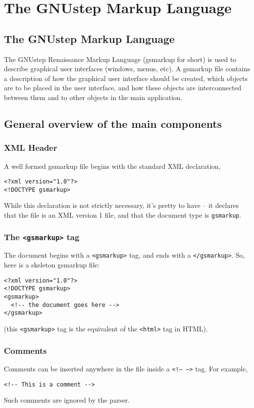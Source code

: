 \chapter{The GNUstep Markup Language}
\section{The GNUstep Markup Language}

The GNUstep Renaissance Markup Language (gsmarkup for short) is used to
describe graphical user interfaces (windows, menus, etc).  A gsmarkup
file contains a description of how the graphical user interface should
be created, which objects are to be placed in the user interface, and
how these objects are interconnected between them and to other objects
in the main application.

\section{General overview of the main components}

\subsection{XML Header}
A well formed gsmarkup file begins with the standard XML declaration,
\begin{verbatim}
<?xml version="1.0"?>
<!DOCTYPE gsmarkup>
\end{verbatim}
While this declaration is not strictly necessary, it's pretty to have
-- it declares that the file is an XML version 1 file, and that the
document type is \texttt{gsmarkup}.

\subsection{The \texttt{<gsmarkup>} tag}
The document begins with a \texttt{<gsmarkup>} tag, and ends with a 
\texttt{</gsmarkup>}.  So, here is a skeleton gsmarkup file:
\begin{verbatim}
<?xml version="1.0"?>
<!DOCTYPE gsmarkup>
<gsmarkup>
  <!-- the document goes here -->
</gsmarkup>
\end{verbatim}
(this \texttt{<gsmarkup>} tag is the equivalent of the \texttt{<html>}
tag in HTML).

\subsection{Comments}
Comments can be inserted anywhere in the file inside a \texttt{<!--
-->} tag.  For example,
\begin{verbatim}
<!-- This is a comment -->
\end{verbatim}
Such comments are ignored by the parser.


